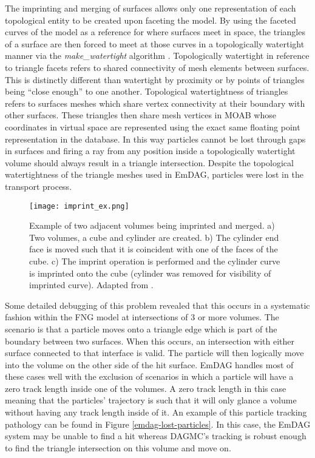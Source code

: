 The imprinting and merging of surfaces allows only one representation of each
topological entity to be created upon faceting the model. By using the faceted
curves of the model as a reference for where surfaces meet in space, the
triangles of a surface are then forced to meet at those curves in a
topologically watertight manner via the \textit{make\_watertight} algorithm
\cite{Smith_2011}. Topologically watertight in reference to triangle facets
refers to shared connectivity of mesh elements between surfaces. This is
distinctly different than watertight by proximity or by points of triangles
being ``close enough'' to one another. Topological watertightness of triangles
refers to surfaces meshes which share vertex connectivity at their boundary with
other surfaces. These triangles then share mesh vertices in MOAB whose
coordinates in virtual space are represented using the exact same floating point
representation in the database. In this way particles cannot be lost through
gaps in surfaces and firing a ray from any position inside a topologically
watertight volume should always result in a triangle intersection. Despite the
topological watertightness of the triangle meshes used in EmDAG, particles were
lost in the transport process.

\begin{figure}[H]
  \centering
  \texttt{[image: imprint\_ex.png]}
  \caption[Graphical depiction of the imprinting process.]{Example of two
    adjacent volumes being imprinted and merged. a) Two volumes, a cube and
    cylinder are created. b) The cylinder end face is moved such that it is
    coincident with one of the faces of the cube. c) The imprint operation is
    performed and the cylinder curve is imprinted onto the cube (cylinder was
    removed for visibility of imprinted curve). Adapted from \cite{White_2002}.}
  \label{imprint_ex}
\end{figure}

Some detailed debugging of this problem revealed that this occurs in a
systematic fashion within the FNG model at intersections of 3 or more
volumes. The scenario is that a particle moves onto a triangle edge which is
part of the boundary between two surfaces. When this occurs, an intersection
with either surface connected to that interface is valid. The particle will then
logically move into the volume on the other side of the hit surface. EmDAG
handles most of these cases well with the exclusion of scenarios in which a
particle will have a zero track length inside one of the volumes. A zero track
length in this case meaning that the particles' trajectory is such that it will
only glance a volume without having any track length inside of
it. An example of this particle tracking pathology can be found in Figure
\ref{emdag-lost-particles}. In this case, the EmDAG system may be unable to find
a hit whereas DAGMC's tracking is robust enough to find the triangle
intersection on this volume and move on.


